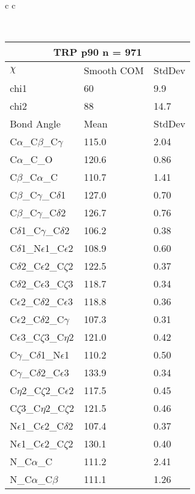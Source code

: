 \newpage

\begin{longtable}{ c c }

\caption{TRP Central Values}\\
  \begin{tabular}{ l l l }
  \toprule
  \multicolumn{3}{c}{TRP \textbf{p90} n = 971} \\ \toprule
  $\chi$       & Smooth COM & StdDev \\ \midrule
  chi1 & 60 & 9.9 \\ 
  chi2 & 88 & 14.7 \\ \midrule
  Bond Angle   & Mean     & StdDev \\ \midrule
  C$\alpha$\_C$\beta$\_C$\gamma$ & 115.0 & 2.04\\
  C$\alpha$\_C\_O & 120.6 & 0.86\\
  C$\beta$\_C$\alpha$\_C & 110.7 & 1.41\\
  C$\beta$\_C$\gamma$\_C$\delta$1 & 127.0 & 0.70\\
  C$\beta$\_C$\gamma$\_C$\delta$2 & 126.7 & 0.76\\
  C$\delta$1\_C$\gamma$\_C$\delta$2 & 106.2 & 0.38\\
  C$\delta$1\_N$\epsilon$1\_C$\epsilon$2 & 108.9 & 0.60\\
  C$\delta$2\_C$\epsilon$2\_C$\zeta$2 & 122.5 & 0.37\\
  C$\delta$2\_C$\epsilon$3\_C$\zeta$3 & 118.7 & 0.34\\
  C$\epsilon$2\_C$\delta$2\_C$\epsilon$3 & 118.8 & 0.36\\
  C$\epsilon$2\_C$\delta$2\_C$\gamma$ & 107.3 & 0.31\\
  C$\epsilon$3\_C$\zeta$3\_C$\eta$2 & 121.0 & 0.42\\
  C$\gamma$\_C$\delta$1\_N$\epsilon$1 & 110.2 & 0.50\\
  C$\gamma$\_C$\delta$2\_C$\epsilon$3 & 133.9 & 0.34\\
  C$\eta$2\_C$\zeta$2\_C$\epsilon$2 & 117.5 & 0.45\\
  C$\zeta$3\_C$\eta$2\_C$\zeta$2 & 121.5 & 0.46\\
  N$\epsilon$1\_C$\epsilon$2\_C$\delta$2 & 107.4 & 0.37\\
  N$\epsilon$1\_C$\epsilon$2\_C$\zeta$2 & 130.1 & 0.40\\
  N\_C$\alpha$\_C & 111.2 & 2.41\\
  N\_C$\alpha$\_C$\beta$ & 111.1 & 1.26\\
  \bottomrule
  \end{tabular}

\end{longtable}
